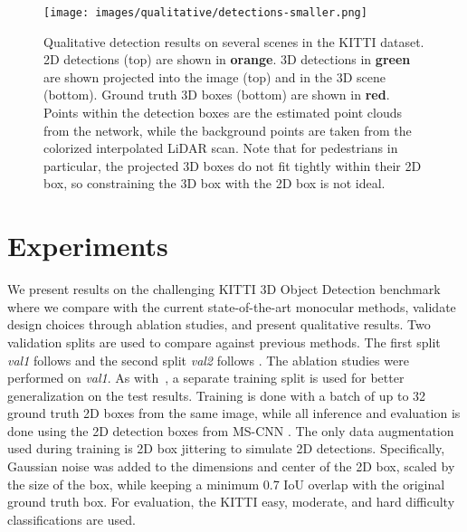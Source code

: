 \documentclass[10pt,twocolumn,letterpaper]{article}
\begin{document}
	\begin{figure*}[t]
		\begin{center}
			\texttt{[image: images/qualitative/detections-smaller.png]}
		\end{center}
		\caption{Qualitative detection results on several scenes in the KITTI dataset. 2D detections (top) are shown in \textbf{orange}. 3D detections in \textbf{green} are shown projected into the image (top) and in the 3D scene (bottom). Ground truth 3D boxes (bottom) are shown in \textbf{red}. Points within the detection boxes are the estimated point clouds from the network, while the background points are taken from the colorized interpolated LiDAR scan. Note that for pedestrians in particular, the projected 3D boxes do not fit tightly within their 2D box, so constraining the 3D box with the 2D box is not ideal.}
		\label{fig:qual_results}
\end{figure*}
	
	\section{Experiments}\label{sec:experiments}
	We present results on the challenging KITTI 3D Object Detection benchmark where we compare with the current state-of-the-art monocular methods, validate design choices through ablation studies, and present qualitative results. Two validation splits are used to compare against previous methods. The first split \textit{val1} follows \cite{chen_mv3d} and the second split \textit{val2} follows \cite{xiang_3dvp}. The ablation studies were performed on \textit{val1}. As with~\cite{lindernoren, qi_fpointnet}, a separate training split is used for better generalization on the test results. Training is done with a batch of up to 32 ground truth 2D boxes from the same image, while all inference and evaluation is done using the 2D detection boxes from MS-CNN \cite{cai}. The only data augmentation used during training is 2D box jittering to simulate 2D detections. Specifically, Gaussian noise was added to the dimensions and center of the 2D box, scaled by the size of the box, while keeping a minimum 0.7 IoU overlap with the original ground truth box. For evaluation, the KITTI easy, moderate, and hard difficulty classifications are used.
	
\end{document}
